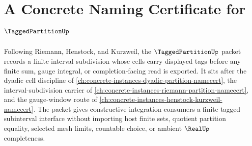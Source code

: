 \chapter{A Concrete Naming Certificate for $\TaggedPartitionUp$}
\label{ch:concrete-instances-tagged-partition-namecert}

Following Riemann, Henstock, and Kurzweil, the $\TaggedPartitionUp$ packet records a finite interval subdivision whose cells carry displayed tags before any finite sum, gauge integral, or completion-facing read is exported. It sits after the dyadic cell discipline of \autoref{ch:concrete-instances-dyadic-partition-namecert}, the interval-subdivision carrier of \autoref{ch:concrete-instances-riemann-partition-namecert}, and the gauge-window route of \autoref{ch:concrete-instances-henstock-kurzweil-namecert}. The packet gives constructive integration consumers a finite tagged-subinterval interface without importing host finite sets, quotient partition equality, selected mesh limits, countable choice, or ambient $\RealUp$ completeness.


